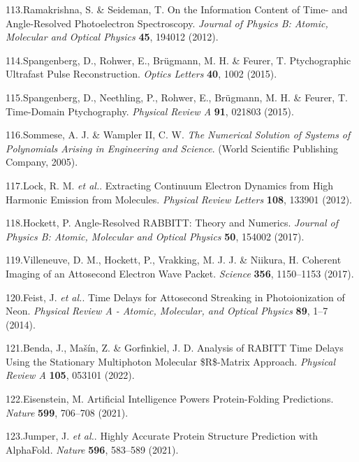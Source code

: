 \documentclass[10pt]{article}
\begin{document}
\label{csl:113}113.Ramakrishna, S. \& Seideman, T. {On the Information Content of Time- and Angle-Resolved Photoelectron Spectroscopy}. \textit{Journal of Physics B: Atomic, Molecular and Optical Physics} \textbf{45}, 194012 (2012).

\label{csl:114}114.Spangenberg, D., Rohwer, E., Br{\"u}gmann, M. H. \& Feurer, T. {Ptychographic Ultrafast Pulse Reconstruction}. \textit{Optics Letters} \textbf{40}, 1002 (2015).

\label{csl:115}115.Spangenberg, D., Neethling, P., Rohwer, E., Br{\"u}gmann, M. H. \& Feurer, T. {Time-Domain Ptychography}. \textit{Physical Review A} \textbf{91}, 021803 (2015).

\label{csl:116}116.Sommese, A. J. \& Wampler II, C. W. \textit{{The {{Numerical Solution}} of {{Systems}} of {{Polynomials Arising}} in {{Engineering}} and {{Science}}}}. ({World Scientific Publishing Company}, 2005).

\label{csl:117}117.Lock, R. M. \textit{et al.}. {Extracting {{Continuum Electron Dynamics}} from {{High Harmonic Emission}} from {{Molecules}}}. \textit{Physical Review Letters} \textbf{108}, 133901 (2012).

\label{csl:118}118.Hockett, P. {Angle-Resolved {{RABBITT}}: Theory and Numerics}. \textit{Journal of Physics B: Atomic, Molecular and Optical Physics} \textbf{50}, 154002 (2017).

\label{csl:119}119.Villeneuve, D. M., Hockett, P., Vrakking, M. J. J. \& Niikura, H. {Coherent Imaging of an Attosecond Electron Wave Packet}. \textit{Science} \textbf{356}, 1150–1153 (2017).

\label{csl:120}120.Feist, J. \textit{et al.}. {Time Delays for Attosecond Streaking in Photoionization of Neon}. \textit{Physical Review A - Atomic, Molecular, and Optical Physics} \textbf{89}, 1–7 (2014).

\label{csl:121}121.Benda, J., Ma{\v s}{\'i}n, Z. \& Gorfinkiel, J. D. {Analysis of {{RABITT}} Time Delays Using the Stationary Multiphoton Molecular \${{R}}\$-Matrix Approach}. \textit{Physical Review A} \textbf{105}, 053101 (2022).

\label{csl:122}122.Eisenstein, M. {Artificial Intelligence Powers Protein-Folding Predictions}. \textit{Nature} \textbf{599}, 706–708 (2021).

\label{csl:123}123.Jumper, J. \textit{et al.}. {Highly Accurate Protein Structure Prediction with {{AlphaFold}}}. \textit{Nature} \textbf{596}, 583–589 (2021).
\end{document}
